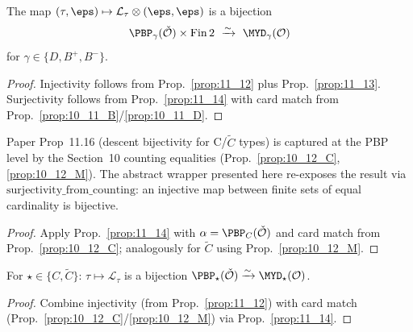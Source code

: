 \begin{proposition}
  \label{prop:11_15}
  \leanok
  The map $(\tau, \eps) \mapsto \mathcal{L}_\tau \otimes (\eps, \eps)$ is a bijection
  \[ \PBP_\gamma(\check{\mathcal{O}}) \times \mathrm{Fin}\,2 \ \xrightarrow{\sim}\ \MYD_\gamma(\mathcal{O}) \]
  for $\gamma \in \{D, B^+, B^-\}$.
\end{proposition}
\begin{proof}
  \leanok
  Injectivity follows from Prop.~\ref{prop:11_12} plus Prop.~\ref{prop:11_13}. Surjectivity follows from Prop.~\ref{prop:11_14} with card match from Prop.~\ref{prop:10_11_B}/\ref{prop:10_11_D}.
\end{proof}


\begin{proposition}
  \label{prop:11_16}
  \leanok
  Paper Prop~11.16 (descent bijectivity for C/$\tilde{C}$ types) is captured at
  the PBP level by the Section~10 counting equalities (Prop.~\ref{prop:10_12_C},
  \ref{prop:10_12_M}). The abstract wrapper presented here re-exposes the result
  via $\mathrm{surjectivity\_from\_counting}$: an injective map between finite
  sets of equal cardinality is bijective.
\end{proposition}
\begin{proof}
  \leanok
  Apply Prop.~\ref{prop:11_14} with $\alpha = \PBP_C(\check{\mathcal{O}})$ and card match from Prop.~\ref{prop:10_12_C}; analogously for $\tilde{C}$ using Prop.~\ref{prop:10_12_M}.
\end{proof}


\begin{proposition}
  \label{prop:11_17}
  \leanok
  For $\star \in \{C, \tilde{C}\}$: $\tau \mapsto \mathcal{L}_\tau$ is a bijection
  $\PBP_\star(\check{\mathcal{O}}) \xrightarrow{\sim} \MYD_\star(\mathcal{O})$.
\end{proposition}
\begin{proof}
  \leanok
  Combine injectivity (from Prop.~\ref{prop:11_12}) with card match (Prop.~\ref{prop:10_12_C}/\ref{prop:10_12_M}) via Prop.~\ref{prop:11_14}.
\end{proof}



